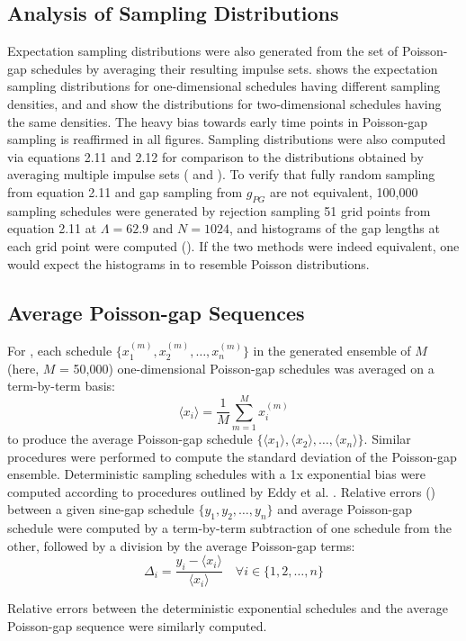 \subsection{Analysis of Sampling Distributions}

\begin{doublespace}
Expectation sampling distributions were also generated from the set of
Poisson-gap schedules by averaging their resulting impulse sets.
 shows the expectation sampling distributions
for one-dimensional schedules having different sampling densities, and
 and  show the distributions
for two-dimensional schedules having the same densities. The heavy bias
towards early time points in Poisson-gap sampling is reaffirmed in all
figures. Sampling distributions were also computed via equations
2.11 and 2.12 for comparison to the distributions obtained by averaging
multiple impulse sets ( and ).
To verify that fully random sampling from equation 2.11 and gap sampling
from $g_{PG}$ are not equivalent, 100,000 sampling schedules were generated
by rejection sampling 51 grid points from equation 2.11 at $\Lambda=62.9$
and $N=1024$, and histograms of the gap lengths at each grid point were
computed (). If the two methods were indeed
equivalent, one would expect the histograms in  to
resemble Poisson distributions.
\end{doublespace}

\subsection{Average Poisson-gap Sequences}

\begin{doublespace}
For , each schedule
$\{x_1^{(m)}, x_2^{(m)},\dots, x_n^{(m)}\}$ in
the generated ensemble of $M$ (here, $M$ = 50,000)
one-dimensional Poisson-gap schedules was averaged
on a term-by-term basis:
\begin{equation}
\langle x_i \rangle = \frac{1}{M} \sum_{m=1}^M x_i^{(m)}
\end{equation}
to produce the average Poisson-gap schedule
$\{\langle x_1 \rangle, \langle x_2 \rangle,\dots, \langle x_n \rangle\}$.
Similar procedures were performed to compute the standard deviation of the
Poisson-gap ensemble. Deterministic sampling schedules with a 1x exponential
bias were computed according to procedures outlined by
Eddy et al. \cite{eddy:jmr2012}. Relative errors
() between a given
sine-gap schedule $\{y_1, y_2,\dots, y_n\}$ and average Poisson-gap schedule
were computed by a term-by-term subtraction of one schedule from the other,
followed by a division by the average Poisson-gap terms:
\begin{equation}
\Delta_i = \frac{y_i - \langle x_i \rangle}{\langle x_i \rangle}
 \quad \forall i \in \{1,2,\dots, n\}
\end{equation}

Relative errors between the deterministic exponential schedules and the
average Poisson-gap sequence were similarly computed.
\end{doublespace}

